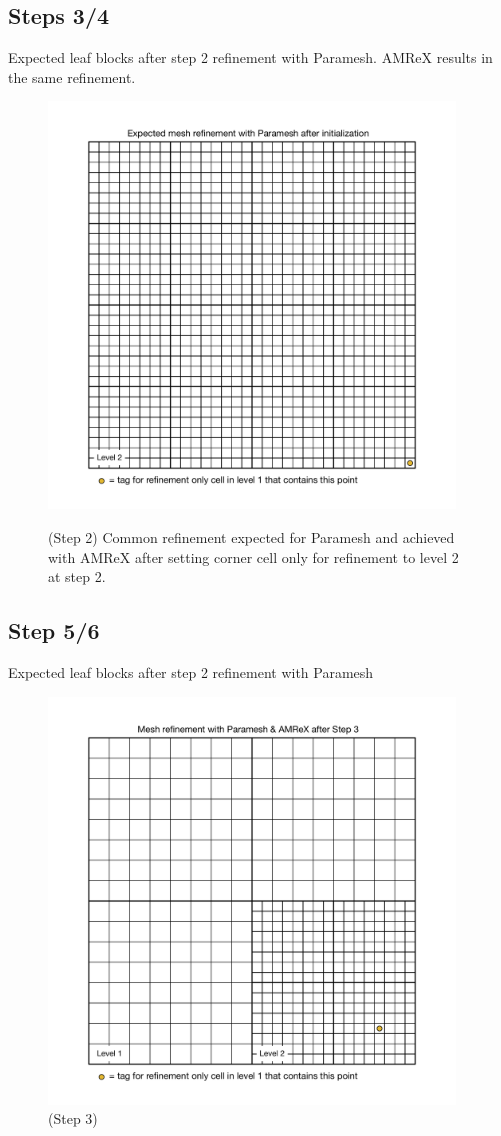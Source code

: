 \documentclass[12pt,letterpaper]{article}
\begin{document}
\subsection{Steps 3/4}
Expected leaf blocks after step 2 refinement with Paramesh.  AMReX results in
the same refinement.
\begin{figure}[!hp]
\begin{center}
\includegraphics[width=4.25in]{TestRefine_Step2_Both.pdf}\\
\caption{(Step 2) Common refinement expected for Paramesh and achieved with AMReX after
setting corner cell only for refinement to level 2 at step 2.}
\end{center}
\end{figure}

\newpage
\subsection{Step 5/6}
Expected leaf blocks after step 2 refinement with Paramesh
\begin{figure}[!hp]
\begin{center}
\includegraphics[width=4.25in]{TestRefine_Step6_Both.pdf}
\caption{(Step 3) }
\end{center}
\end{figure}
\end{document}
